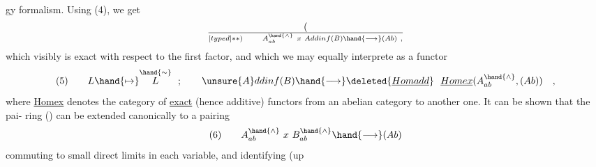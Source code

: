 gy formalism.  Using (4),  we get  
\[ (\over[typed]{*}{*}) \qquad A^{\hand{\wedge}}_{ab} \ x \ Addinf(B) \hand{\longrightarrow} (Ab) \ , \]
which visibly is exact with respect to the first  factor, and
which we may equally interprete as a functor
\[ (5) \qquad L \hand{\mapsto} \overset{\hand{\sim}}{L} \ \ ; \qquad \unsure{A}ddinf(B) \hand{\longrightarrow} \deleted{\underline{Homadd}} \ \ \underline{Homex}(A^{\hand{\wedge}}_{ab},(Ab)) \quad , \]
where \uline{Homex}  denotes the category of \uline{exact} (hence additive)  functors 
from an abelian category to another one. It can be shown that the pai-%
ring (\over[typed]{*}{*})  can be extended canonically to a pairing
\[ (6) \qquad A^{\hand{\wedge}}_{ab} \ x \ B^{\hand{\wedge}}_{ab} \hand{\longrightarrow} (Ab) \]
commuting to small direct limits in each variable,  and identifying (up


